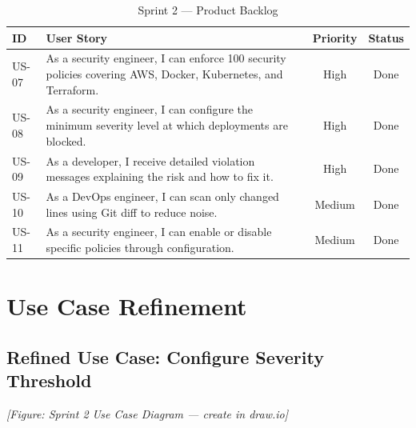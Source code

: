 \begin{table}[H]
\centering
\caption{Sprint 2 — Product Backlog}
\label{tab:sprint2-backlog}
\begin{tabular}{|p{0.8cm}|p{8.5cm}|c|c|}
\hline
\textbf{ID} & \textbf{User Story} & \textbf{Priority} & \textbf{Status} \\
\hline
US-07 & As a security engineer, I can enforce 100 security policies covering AWS, Docker, Kubernetes, and Terraform. & High & Done \\
\hline
US-08 & As a security engineer, I can configure the minimum severity level at which deployments are blocked. & High & Done \\
\hline
US-09 & As a developer, I receive detailed violation messages explaining the risk and how to fix it. & High & Done \\
\hline
US-10 & As a DevOps engineer, I can scan only changed lines using Git diff to reduce noise. & Medium & Done \\
\hline
US-11 & As a security engineer, I can enable or disable specific policies through configuration. & Medium & Done \\
\hline
\end{tabular}
\end{table}

\section{Use Case Refinement}

\subsection{Refined Use Case: Configure Severity Threshold}


\textit{[Figure: Sprint 2 Use Case Diagram — create in draw.io]}

\vspace{0.3cm}

